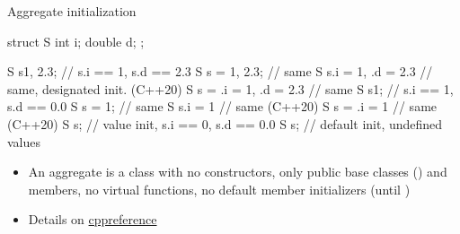 \begin{frame}[fragile,shrink=10]
  \begin{block}{Aggregate initialization}
    \begin{cppcode}
      struct S { int i; double d; };

      S s{1, 2.3};             // s.i == 1, s.d == 2.3
      S s = {1, 2.3};          // same
      S s{.i = 1, .d = 2.3}    // same, designated init. (C++20)
      S s = {.i = 1, .d = 2.3} // same
      S s{1};        // s.i == 1, s.d == 0.0
      S s = {1};     // same
      S s{.i = 1}    // same (C++20)
      S s = {.i = 1} // same (C++20)
      S s{}; // value init, s.i == 0, s.d == 0.0
      S s;   // default init, undefined values
    \end{cppcode}
    \begin{itemize}
      \item An aggregate is a class with no constructors, only public base classes () and members, no virtual functions, no default member initializers (until )
      \item Details on \href{https://en.cppreference.com/w/cpp/language/aggregate_initialization}{cppreference}
    \end{itemize}
  \end{block}
\end{frame}

